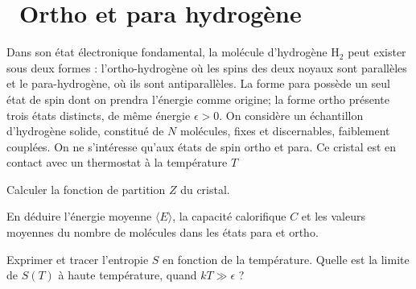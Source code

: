 \documentclass[utf8, 11pt]{feuille}
\begin{document}




\section{\medium~Ortho et para hydrogène}

Dans son état électronique fondamental, la molécule d'hydrogène H$_2$ peut exister sous deux formes : l'ortho-hydrogène où les spins des deux noyaux sont parallèles et le para-hydrogène, où ils sont antiparallèles. La forme para possède un seul état de spin dont on prendra l'énergie comme origine; la forme ortho présente trois états distincts, de même énergie $\epsilon >0$. On considère un échantillon d'hydrogène solide, constitué de $N$ molécules, fixes et discernables, faiblement couplées. On ne s'intéresse qu'aux états de spin ortho et para. Ce cristal est en contact avec un thermostat à la
température $T$


\question
Calculer la fonction de partition $Z$ du cristal.

\question
En déduire l'énergie moyenne $\langle E \rangle$, la capacité calorifique $C$ et les valeurs moyennes du nombre de molécules dans les états para et ortho.

\question
Exprimer et tracer l'entropie $S$ en fonction de la température.  Quelle est la limite de $S(T)$ à haute température, quand $kT \gg \epsilon $ ?
  
\end{document}
